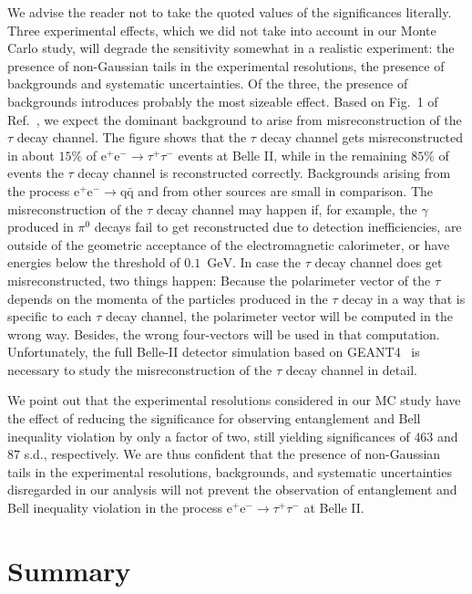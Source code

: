 \documentclass[a4paper,12pt,twocolumn]{article}
\numberwithin{equation}{section} %
\newcommand{\Pem}{\ensuremath{\textrm{e}^{-}}\xspace}
\newcommand{\Pep}{\ensuremath{\textrm{e}^{+}}\xspace}
\newcommand{\Pgg}{\ensuremath{\gamma}\xspace}
\newcommand{\Pgpz}{\ensuremath{\pi^{\textrm{0}}}\xspace}
\newcommand{\Pgt}{\ensuremath{\tau}\xspace}
\newcommand{\Pgtm}{\ensuremath{\tau^{-}}\xspace}
\newcommand{\Pgtp}{\ensuremath{\tau^{+}}\xspace}
\newcommand{\GeV}{\ensuremath{\textrm{GeV}}\xspace}
\begin{document}
We advise the reader not to take the quoted values of the significances literally.
Three experimental effects, which we did not take into account in our Monte Carlo study, will degrade the sensitivity somewhat in a realistic experiment: the presence of non-Gaussian tails in the experimental resolutions, the presence of backgrounds and systematic uncertainties. Of the three, the presence of backgrounds introduces probably  the most sizeable effect.
Based on Fig.~1 of Ref.~\cite{Belle-II:2023izd}, we expect the dominant background to arise from misreconstruction of the $\Pgt$ decay channel. The figure shows that the $\Pgt$ decay channel gets misreconstructed in about $15\%$ of $\Pep\Pem \to \Pgtp\Pgtm$ events at Belle II, while in the remaining $85\%$ of events the $\Pgt$ decay channel is reconstructed correctly. Backgrounds arising from the process $\Pep\Pem \to \textrm{q}\bar{\textrm{q}}$ and from other sources are small in comparison.
The misreconstruction of the $\Pgt$ decay channel may happen if, for example, the $\Pgg$ produced in $\Pgpz$ decays fail to get reconstructed due to detection inefficiencies, are outside of the geometric acceptance of the electromagnetic calorimeter, or have energies below the threshold of $0.1$~\GeV.
In case the $\Pgt$ decay channel does get misreconstructed, two things happen: Because the polarimeter vector of the $\Pgt$ depends on the momenta of the particles produced in the $\Pgt$ decay in a way that is specific to each $\Pgt$ decay channel, the polarimeter vector will be computed in the wrong way. Besides, the wrong four-vectors will be used in that computation.
Unfortunately, the full Belle-II detector simulation based on GEANT4~\cite{GEANT4:2002zbu} is necessary to study the misreconstruction of the $\Pgt$ decay channel in detail.

We point out that the experimental resolutions considered in our MC study have the effect of reducing the significance for observing entanglement and Bell inequality violation by only a factor of two, still yielding significances of $463$ and $87$ s.d., respectively. We are thus confident that the presence of non-Gaussian tails in the experimental resolutions, backgrounds, and systematic uncertainties disregarded in our analysis will not prevent the observation of entanglement and Bell inequality violation in the process $\Pep\Pem \to \Pgtp\Pgtm$ at Belle II.


\section{Summary}
\label{sec:Summary}
\end{document}

